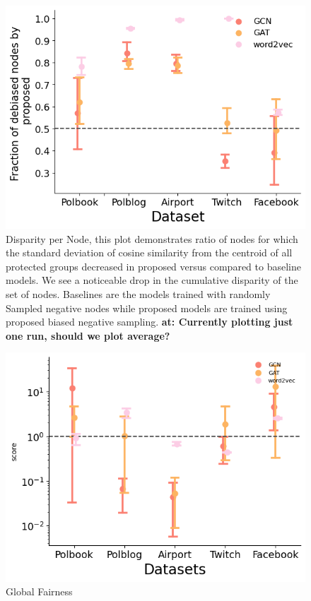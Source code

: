 \documentclass{article}
\theoremstyle{plain}
\theoremstyle{definition}
\theoremstyle{remark}
\def\at#1{{\color{green}\textbf{at: #1}}}
\begin{document}
\begin{figure}[h!]
    \includegraphics[width=.5\textwidth, height=.5\textwidth]{images/new_images/deepwalk_disparity_per_node.png}
    \caption{Disparity per Node, this plot demonstrates ratio of nodes for which the standard deviation of cosine similarity from the centroid of all protected groups decreased in proposed versus compared to baseline models. We see a noticeable drop in the cumulative disparity of the set of nodes. Baselines are the models trained with randomly Sampled negative nodes while proposed models are trained using proposed biased negative sampling. \at{Currently plotting just one run, should we plot average?}}
    \label{fig:disparity_per_node_deepwalk}
\end{figure}
\begin{figure}
    \includegraphics[width=.5\textwidth, height=.5\textwidth]{images/new_images/deepwalk_disparity_per_node_global.png}
    \caption{Global Fairness}
    \label{fig:disparity_global_deepwalk}
\end{figure}
\end{document}
